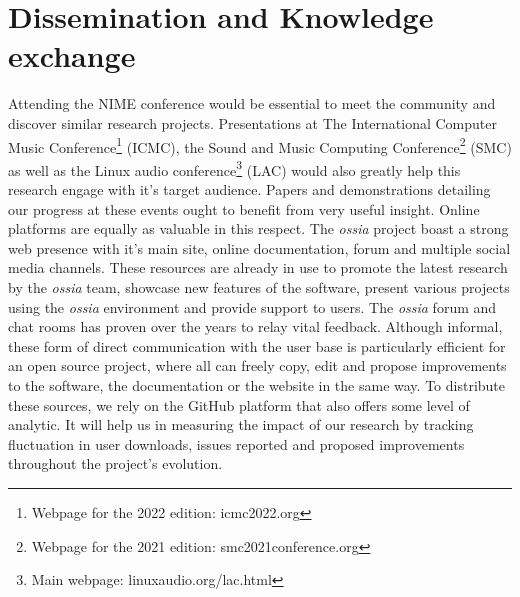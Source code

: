 \documentclass[journal,onecolumn]{IEEEtran}
\begin{document}
\section{Dissemination and Knowledge exchange} %
Attending the NIME conference would be essential to meet the community and discover similar research projects. Presentations at The International Computer Music Conference\footnote{Webpage for the 2022 edition: icmc2022.org}  (ICMC), the Sound and Music Computing Conference\footnote{Webpage for the 2021 edition: smc2021conference.org} (SMC) as well as the Linux audio conference\footnote{Main webpage: linuxaudio.org/lac.html} (LAC) would also greatly help this research engage with it's target audience. Papers and demonstrations detailing our progress at these events ought to benefit from very useful insight. Online platforms are equally as valuable in this respect. The \textit{ossia} project boast a strong web presence with it's main site, online documentation, forum and multiple social media channels. These resources are already in use to promote the latest research by the \textit{ossia} team, showcase new features of the software, present various projects using the \textit{ossia} environment and provide support to users. The \textit{ossia} forum and chat rooms has proven over the years to relay vital feedback. Although informal, these form of direct communication with the user base is particularly efficient for an open source project, where all can freely copy, edit and propose improvements to the software, the documentation or the website in the same way. To distribute these sources, we rely on the GitHub platform that also offers some level of analytic. It will help us in measuring the impact of our research by tracking fluctuation in user downloads, issues reported and proposed improvements throughout the project's evolution. 

\end{document}
